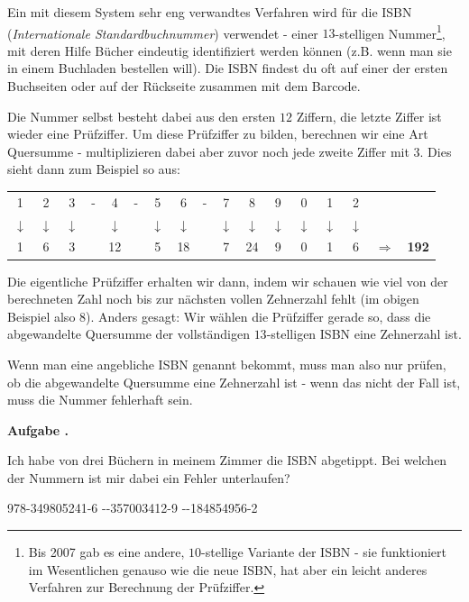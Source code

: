\documentclass[a4paper,ngerman,12pt]{scrartcl}
\theoremstyle{definition}
\theoremstyle{plain}
\theoremstyle{remark}
\newlength{\aufgabenskip}
\newcounter{aufgabennummer}
\newenvironment{aufgabe}[1]{
	\addtocounter{aufgabennummer}{1}
	\textbf{Aufgabe \theaufgabennummer.} \emph{#1} \par
}{\vspace{\aufgabenskip}}
\begin{document}
Ein mit diesem System sehr eng verwandtes Verfahren wird für die ISBN (\emph{Internationale Standardbuchnummer}) verwendet - einer $13$-stelligen Nummer\footnote{Bis 2007 gab es eine andere, $10$-stellige Variante der ISBN - sie funktioniert im Wesentlichen genauso wie die neue ISBN, hat aber ein leicht anderes Verfahren zur Berechnung der Prüfziffer.}, mit deren Hilfe Bücher eindeutig identifiziert werden können (z.B. wenn man sie in einem Buchladen bestellen will). Die ISBN findest du oft auf einer der ersten Buchseiten oder auf der Rückseite zusammen mit dem Barcode.

Die Nummer selbst besteht dabei aus den ersten $12$ Ziffern, die letzte Ziffer ist wieder eine Prüfziffer. Um diese Prüfziffer zu bilden, berechnen wir eine Art Quersumme - multiplizieren dabei aber zuvor noch jede zweite Ziffer mit $3$. Dies sieht dann zum Beispiel so aus:

\begin{center}
	\begin{tabular}{ccccccccccccccccc}
		1 & 2 & 3 & - & 4 & - & 5 & 6 & - & 7 & 8 & 9 & 0 & 1 & 2 & & \\
		$\downarrow$ & $\downarrow$ & $\downarrow$ & & $\downarrow$ & & $\downarrow$ & $\downarrow$ & & $\downarrow$ & $\downarrow$ & $\downarrow$ & $\downarrow$ & $\downarrow$ & $\downarrow$ & & \\
		1 & 6 & 3 & & 12 & & 5 & 18 & & 7 & 24 & 9 & 0 & 1 & 6 & $\Rightarrow$ & \textbf{192}
	\end{tabular}
\end{center}

Die eigentliche Prüfziffer erhalten wir dann, indem wir schauen wie viel von der berechneten Zahl noch bis zur nächsten vollen Zehnerzahl fehlt (im obigen Beispiel also $8$). Anders gesagt: Wir wählen die Prüfziffer gerade so, dass die abgewandelte Quersumme der vollständigen $13$-stelligen ISBN eine Zehnerzahl ist. 

Wenn man eine angebliche ISBN genannt bekommt, muss man also nur prüfen, ob die abgewandelte Quersumme eine Zehnerzahl ist - wenn das nicht der Fall ist, muss die Nummer fehlerhaft sein.

\begin{aufgabe}{}
	Ich habe von drei Büchern in meinem Zimmer die ISBN abgetippt. Bei welchen der Nummern ist mir dabei ein Fehler unterlaufen?
	\begin{center}
		978-349805241-6 \quad--357003412-9 \quad--184854956-2
	\end{center}
\end{aufgabe}
\end{document}
